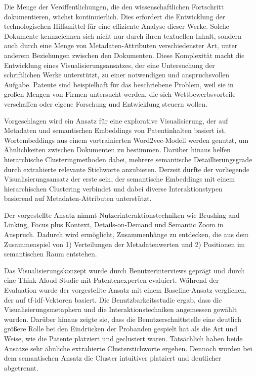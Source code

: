
\Abstract
Die Menge der Veröffentlichungen, die den wissenschaftlichen Fortschritt dokumentieren, wächst kontinuierlich.
Dies erfordert die Entwicklung der technologischen Hilfsmittel für eine effiziente Analyse dieser Werke.
Solche Dokumente kennzeichnen sich nicht nur durch ihren textuellen Inhalt, sondern auch durch eine Menge von Metadaten-Attributen verschiedenster Art, unter anderem Beziehungen zwischen den Dokumenten.
Diese Komplexität macht die Entwicklung eines Visualisierungsansatzes, der eine Untersuchung der schriftlichen Werke unterstützt, zu einer notwendigen und anspruchsvollen Aufgabe.
Patente sind beispielhaft für das beschriebene Problem, weil sie in großen Mengen von Firmen untersucht werden, die sich Wettbewerbsvorteile verschaffen oder eigene Forschung und Entwicklung steuern wollen.

Vorgeschlagen wird ein Ansatz für eine explorative Visualisierung, der auf Metadaten und semantischen Embeddings von Patentinhalten basiert ist.
Wortembeddings aus einem vortrainierten Word2vec-Modell werden genutzt, um Ähnlichkeiten zwischen Dokumenten zu bestimmen.
Darüber hinaus helfen hierarchische Clusteringmethoden dabei, mehrere semantische Detaillierungsgrade durch extrahierte relevante Stichworte anzubieten.
Derzeit dürfte der vorliegende Visualisierungsansatz der erste sein, der semantische Embeddings mit einem hierarchischen Clustering verbindet und dabei diverse Interaktionstypen basierend auf Metadaten-Attributen unterstützt.

Der vorgestellte Ansatz nimmt Nutzerinteraktionstechniken wie Brushing and Linking, Focus plus Kontext, Details-on-Demand und Semantic Zoom in Anspruch.
Dadurch wird ermöglicht, Zusammenhänge zu entdecken, die aus dem Zusammenspiel von 1) Verteilungen der Metadatenwerten und 2) Positionen im semantischen Raum entstehen.

Das Visualisierungskonzept wurde durch Benutzerinterviews geprägt und durch eine Think-Aloud-Studie mit Patentenexperten evaluiert.
Während der Evaluation wurde der vorgestellte Ansatz mit einem Baseline-Ansatz verglichen, der auf \gls{tf-idf}-Vektoren basiert.
Die Benutzbarkeitsstudie ergab, dass die Visualisierungsmetaphern und die Interaktionstechniken angemessen gewählt wurden.
Darüber hinaus zeigte sie, dass die Benutzerschnittstelle eine deutlich größere Rolle bei den Eindrücken der Probanden gespielt hat als die Art und Weise, wie die Patente platziert und geclustert waren.
Tatsächlich haben beide Ansätze sehr ähnliche extrahierte Clusterstichworte ergeben.
Dennoch wurden bei dem semantischen Ansatz die Cluster intuitiver platziert und deutlicher abgetrennt.

